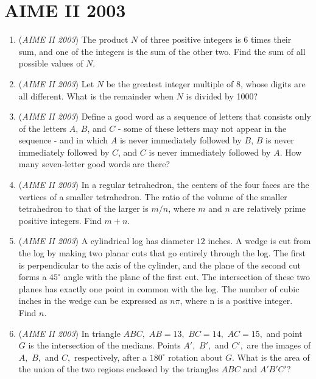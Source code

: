 \section{AIME II 2003}
        \begin{enumerate}
        	\item (\textit{AIME II 2003}) The product $N$ of three positive integers is 6 times their sum, and one of the integers is the sum of the other two. Find the sum of all possible values of $N$.


 

	\item (\textit{AIME II 2003}) Let $N$ be the greatest integer multiple of 8, whose digits are all different. What is the remainder when $N$ is divided by 1000?


 

	\item (\textit{AIME II 2003}) Define a $\text{good word}$ as a sequence of letters that consists only of the letters $A$, $B$, and $C$ - some of these letters may not appear in the sequence - and in which $A$ is never immediately followed by $B$, $B$ is never immediately followed by $C$, and $C$ is never immediately followed by $A$. How many seven-letter good words are there?


 

	\item (\textit{AIME II 2003}) In a regular tetrahedron, the centers of the four faces are the vertices of a smaller tetrahedron. The ratio of the volume of the smaller tetrahedron to that of the larger is $m/n$, where $m$ and $n$ are relatively prime positive integers. Find $m+n$.


 

	\item (\textit{AIME II 2003}) A cylindrical log has diameter $12$ inches. A wedge is cut from the log by making two planar cuts that go entirely through the log. The first is perpendicular to the axis of the cylinder, and the plane of the second cut forms a $45^\circ$ angle with the plane of the first cut. The intersection of these two planes has exactly one point in common with the log. The number of cubic inches in the wedge can be expressed as $n\pi$, where n is a positive integer. Find $n$.


 

	\item (\textit{AIME II 2003}) In triangle $ABC,$ $AB = 13,$ $BC = 14,$ $AC = 15,$ and point $G$ is the intersection of the medians. Points $A',$ $B',$ and $C',$ are the images of $A,$ $B,$ and $C,$ respectively, after a $180^\circ$ rotation about $G.$ What is the area of the union of the two regions enclosed by the triangles $ABC$ and $A'B'C'?$



\end{enumerate}
